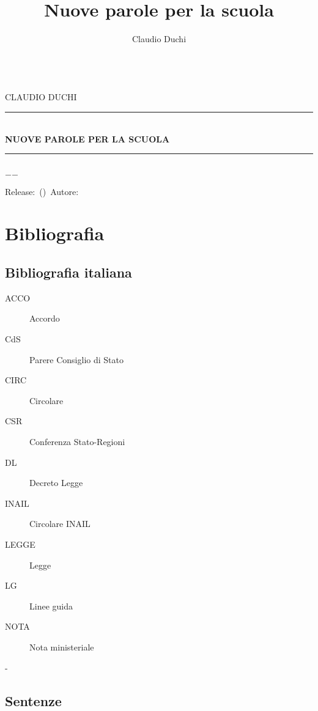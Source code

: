 \documentclass[a4paper]{book}%
\title{Nuove parole per la scuola}
\author{Claudio Duchi}
\date{\datetime}
\makeatletter
\newcommand{\HRule}{\rule{\linewidth}{0.5mm}}
\renewcommand\frontmatter{%
	\cleardoublepage
	\@mainmatterfalse
	\pagenumbering{arabic}}
\renewcommand\mainmatter{%
	\cleardoublepage
	\@mainmattertrue}
\makeatother
\begin{document}
\let\cleardoublepage\clearpage
	\pagestyle{fancy}
	\fncyfront
	\frontmatter
		\hypersetup{pageanchor=false}
		\begin{titlepage}\parindent=0pt
			\centering
	\begin{center}
	\Lgrandedue\\[1cm]
	\textsc{\trjnfamily\LARGE CLAUDIO DUCHI}\\[1.2cm]
	\HRule \\[0.4cm]
	{ \trjnfamily\huge \bfseries NUOVE PAROLE PER LA SCUOLA}\\[0.4cm]
	\HRule \\[1.2cm]
	\vfill
	{\large $-$\DTMnow$-$}	
\end{center}
{\centering
	Release:\gitReln\ (\gitAbbrevHash)\ Autore:\gitAuthorName\ 
	\gitCommitterDate \\
}
		\end{titlepage}
	\setcounter{page}{2}
		\CDcopyright
		\tableofcontents
			\listoftables
{}  %
			
	\fncymain
	\mainmatter
\cleardoublepage
\glsaddall	
\printglossaries
	
\nocite{*}



\chapter{Bibliografia}

 \section{Bibliografia italiana}
 \begin{description}
 	\item[ACCO] Accordo
 	\item[CdS] Parere Consiglio di Stato
 	\item[CIRC] Circolare 
 	\item[CSR] Conferenza Stato-Regioni
 	\item[DL] Decreto Legge
 	\item[INAIL] Circolare INAIL
 	\item[LEGGE] Legge
 	\item[LG] Linee guida
 	\item[NOTA] Nota ministeriale
 \end{description}
\printbibliography[keyword=LEX,heading=subbibliography]
-\section{Sentenze}
\printbibliography[keyword=SEN,heading=subbibliography]
 
\end{document}
